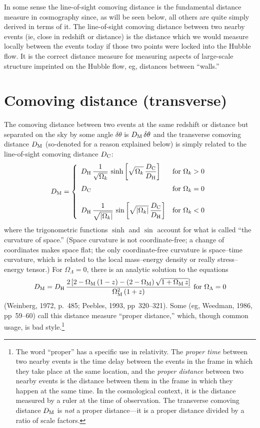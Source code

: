 In some sense the line-of-sight comoving distance is the fundamental
distance measure in cosmography since, as will be seen below, all
others are quite simply derived in terms of it.  The line-of-sight
comoving distance between two nearby events (ie, close in redshift or
distance) is the distance which we would measure locally between the
events today if those two points were locked into the Hubble flow.  It
is the correct distance measure for measuring aspects of large-scale
structure imprinted on the Hubble flow, eg, distances between
``walls.''


\section{Comoving distance (transverse)}

The comoving distance between two events at the same redshift or
distance but separated on the sky by some angle $\delta\theta$ is
$D_{\rm M}\,\delta\theta$ and the transverse comoving distance $D_{\rm
M}$ (so-denoted for a reason explained below) is simply related to the
line-of-sight comoving distance $D_{\rm C}$:
\begin{equation}
D_{\rm M} = \left\{
\begin{array}{ll}
\displaystyle
D_{\rm H}\,\frac{1}{\sqrt{\Omega_k}}\,\sinh\left[\sqrt{\Omega_k}\,\frac{D_{\rm C}}{D_{\rm H}}\right] & {\rm for}~\Omega_k>0 \\[3ex]
\displaystyle
D_{\rm C} & {\rm for}~\Omega_k=0 \\[3ex]
\displaystyle
D_{\rm H}\,\frac{1}{\sqrt{|\Omega_k|}}\,\sin\left[\sqrt{|\Omega_k|}\,\frac{D_{\rm C}}{D_{\rm H}}\right] & {\rm for}~\Omega_k<0
\end{array}
\right.
\end{equation}
where the trigonometric functions $\sinh$ and $\sin$ account for what
is called ``the curvature of space.''  (Space curvature is not
coordinate-free; a change of coordinates makes space flat; the only
coordinate-free curvature is space--time curvature, which is related
to the local mass--energy density or really stress--energy tensor.)
For $\Omega_{\Lambda}=0$, there is an analytic solution to the
equations
\begin{equation}
D_{\rm M}=D_{\rm H}\,\frac{2\,[2-\Omega_{\rm M}\,(1-z)-
(2-\Omega_{\rm M})\,\sqrt{1+\Omega_{\rm M}\,z}]}{\Omega_{\rm M}^2\,(1+z)}
~{\rm for}~\Omega_{\Lambda}=0
\end{equation}
(Weinberg, 1972, p.~485; Peebles, 1993, pp~320--321).  Some (eg,
Weedman, 1986, pp~59--60) call this distance measure ``proper
distance,'' which, though common usage, is bad style.\footnote{The
word ``proper'' has a specific use in relativity.  The {\em proper
time\/} between two nearby events is the time delay between the events
in the frame in which they take place at the same location, and the
{\em proper distance\/} between two nearby events is the distance
between them in the frame in which they happen at the same time.  In
the cosmological context, it is the distance measured by a ruler at
the time of observation.  The transverse comoving distance $D_{\rm M}$
is {\em not\/} a proper distance---it is a proper distance divided by
a ratio of scale factors.}

